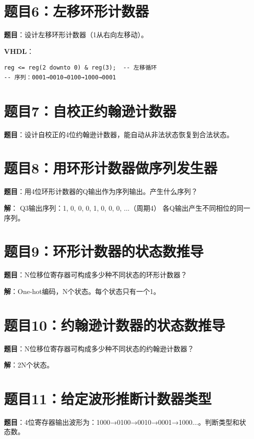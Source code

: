 \section*{题目6：左移环形计数器}

\textbf{题目}：设计左移环形计数器（1从右向左移动）。

\textbf{VHDL}：
\begin{lstlisting}
reg <= reg(2 downto 0) & reg(3);  -- 左移循环
-- 序列：0001→0010→0100→1000→0001
\end{lstlisting}

\section*{题目7：自校正约翰逊计数器}

\textbf{题目}：设计自校正的4位约翰逊计数器，能自动从非法状态恢复到合法状态。

\section*{题目8：用环形计数器做序列发生器}

\textbf{题目}：用4位环形计数器的Q输出作为序列输出。产生什么序列？

\textbf{解}：
Q3输出序列：1, 0, 0, 0, 1, 0, 0, 0, ...（周期4）
各Q输出产生不同相位的同一序列。

\section*{题目9：环形计数器的状态数推导}

\textbf{题目}：N位移位寄存器可构成多少种不同状态的环形计数器？

\textbf{解}：One-hot编码，N个状态。每个状态只有一个1。

\section*{题目10：约翰逊计数器的状态数推导}

\textbf{题目}：N位移位寄存器可构成多少种不同状态的约翰逊计数器？

\textbf{解}：2N个状态。

\section*{题目11：给定波形推断计数器类型}

\textbf{题目}：4位寄存器输出波形为：1000→0100→0010→0001→1000...。判断类型和状态数。

